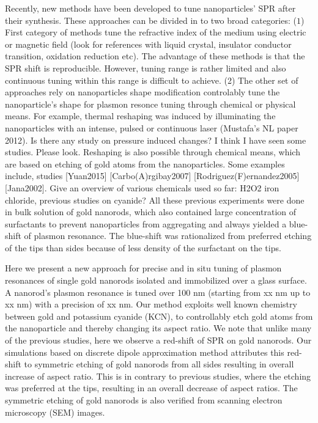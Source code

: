 \documentclass{article}
\begin{document}
Recently, new methods have been developed to tune nanoparticles’ SPR after their
synthesis. These approaches can be divided in to two broad categories: ($1$)
First category of methods tune the refractive index of the medium using electric
or magnetic field (look for references with liquid crystal, insulator conductor
transition, oxidation reduction etc). The advantage of these methods is that the
SPR shift is reproducible. However, tuning range is rather limited and also
continuous tuning within this range is difficult to achieve. (2) The other set
of approaches rely on nanoparticles shape modification controlably tune the
nanoparticle’s shape for plasmon resonce tuning through chemical or physical
means. For example, thermal reshaping was induced by illuminating the
nanoparticles with an intense, pulsed \cite{Link2000}\cite{Horiguchi2008} or
continuous laser (Mustafa’s NL paper 2012). Is there any study on pressure
induced changes? I think I have seen some studies. Please look. Reshaping is
also possible through chemical means, which are based on etching of gold atoms
from the nanoparticles. Some examples include, studies [Yuan2015]
[Carbo\s{}(A)rgibay2007] [Rodriguez\s{}(F)ernandez2005] [Jana2002]. Give an
overview of various chemicals used so far: H2O2 iron chloride, previous studies
on cyanide? All these previous experiments were done in bulk solution of gold
nanorods, which also contained large concentration of surfactants to prevent
nanoparticles from aggregating and always yielded a blue-shift of plasmon
resonance. The blue-shift was rationalized from preferred etching of the tips
than sides because of less density of the surfactant on the tips.

Here we present a new approach for precise and in situ tuning of plasmon
resonances of single gold nanorods isolated and immobilized over a glass
surface. A nanorod’s plasmon resonance is tuned over 100 nm (starting from xx nm
up to xx nm) with a precision of xx nm. Our method exploits well known chemistry
between gold and potassium cyanide (KCN), to controllably etch gold atoms from
the nanoparticle and thereby changing its aspect ratio. We note that unlike many
of the previous studies, here we observe a red-shift of SPR on gold nanorods.
Our simulations based on discrete dipole approximation method attributes this
red-shift to symmetric etching of gold nanorods from all sides resulting in
overall increase of aspect ratio. This is in contrary to previous studies, where
the etching was preferred at the tips, resulting in an overall decrease of
aspect ratios. The symmetric etching of gold nanorods is also verified from
scanning electron microscopy (SEM) images.
\end{document}
